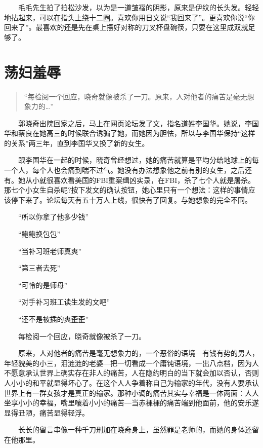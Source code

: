 \documentclass[12pt,UTF8]{ctexbook}
\begin{document}
　　毛毛先生拍了拍松沙发，以为是一道皱褶的阴影，原来是伊纹的长头发。轻轻地拈起来，可以在指头上绕十二圈。喜欢你用日文说\enquote{我回来了}。更喜欢你说\enquote{你回来了}。最喜欢的还是先在桌上摆好对称的刀叉杯盘碗筷，只要在这里成双就足够了。

\hypertarget{ux8361ux5987ux7f9eux8fb1}{%
\section*{荡妇羞辱}\label{ux8361ux5987ux7f9eux8fb1}}

\begin{quote}
\enquote{每检阅一个回应，晓奇就像被杀了一刀。原来，人对他者的痛苦是毫无想象力的\ldots{}}
\end{quote}

　　郭晓奇出院回家之后，马上在网页论坛发了文，指名道姓李国华。她说，李国华和蔡良在她高三的时候联合诱骗了她，而她因为胆怯，所以与李国华保持\enquote{这样的关系}两三年，直到李国华又换了新的女生。

　　跟李国华在一起的时候，晓奇曾经想过，她的痛苦就算是平均分给地球上的每一个人，每个人也会痛到喘不过气。她没有办法想象他之前有别的女生，之后还有。她从小就很喜欢看美国的FBI重案缉凶实录，在FBI，杀了七个人就是屠杀。那七个小女生自杀呢?按下发文的确认按钮，她心里只有一个想法：这样的事情应该停下来了。论坛每天有五十万人上线，很快有了回复。与她想象的完全不同。

　　\enquote{所以你拿了他多少钱}

　　\enquote{鲍鲍换包包}

　　\enquote{当补习班老师真爽}

　　\enquote{第三者去死}

　　\enquote{可怜的是师母}

　　\enquote{对手补习班工读生发的文吧}

　　\enquote{还不是被插的爽歪歪}

　　每检阅一个回应，晓奇就像被杀了一刀。

　　原来，人对他者的痛苦是毫无想象力的，一个恶俗的语境---有钱有势的男人，年轻貌美的小三，泪涟涟的老婆---把一切看成一个庸钝语境，一出八点档，因为人不愿意承认世界上确实存在非人的痛苦，人在隐约明白的当下就会加以否认，否则人小小的和平就显得坏心了。在这个人人争着称自己为输家的年代，没有人要承认世界上有一群女孩才是真正的输家。那种小调的痛苦其实与幸福是一体两面：人人坐享小小的幸福，嘴里嚷着小小的痛苦---当赤裸裸的痛苦端到他面前，他的安乐遂显得丑陋，痛苦显得轻浮。

　　长长的留言串像一种千刀刑加在晓奇身上，虽然罪是老师的，而她的身体还留在他那里。
\end{document}
